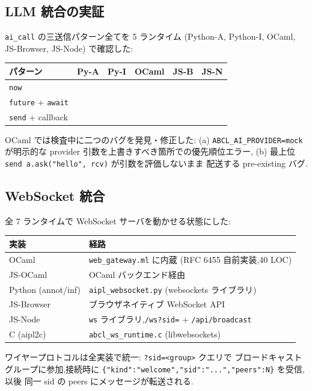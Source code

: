 \documentclass[11pt,a4paper]{article}
\newcommand{\Yes}{\textcolor{green!50!black}{\textbf{\checkmark}}}
\newcommand{\code}[1]{\texttt{\small #1}}
\begin{document}
\subsection{LLM 統合の実証}

\code{ai\_call} の三送信パターン全てを 5 ランタイム (Python-A, Python-I,
OCaml, JS-Browser, JS-Node) で確認した:

\begin{tabularx}{\linewidth}{X l l l l l}
  \toprule
  パターン & Py-A & Py-I & OCaml & JS-B & JS-N \\
  \midrule
  \code{now}                & \Yes & \Yes & \Yes & \Yes & \Yes \\
  \code{future} + \code{await} & \Yes & \Yes & \Yes & \Yes & \Yes \\
  \code{send} + callback     & \Yes & \Yes & \Yes & \Yes & \Yes \\
  \bottomrule
\end{tabularx}

OCaml では検査中に二つのバグを発見・修正した: (a) \code{ABCL\_AI\_PROVIDER=mock}
が明示的な provider 引数を上書きすべき箇所での優先順位エラー,
(b) 最上位 \code{send a.ask("hello",~rcv)} が引数を評価しないまま
配送する pre-existing バグ.

\subsection{WebSocket 統合}

全 7 ランタイムで WebSocket サーバを動かせる状態にした:

\begin{tabularx}{\linewidth}{X X}
  \toprule
  実装 & 経路 \\
  \midrule
  OCaml             & \code{web\_gateway.ml} に内蔵 (RFC 6455 自前実装,40 LOC) \\
  JS-OCaml          & OCaml バックエンド経由 \\
  Python (annot/inf) & \code{aipl\_websocket.py} (websockets ライブラリ) \\
  JS-Browser        & ブラウザネイティブ WebSocket API \\
  JS-Node           & \code{ws} ライブラリ,\code{/ws?sid=} + \code{/api/broadcast} \\
  C (aipl2c)        & \code{abcl\_ws\_runtime.c} (libwebsockets) \\
  \bottomrule
\end{tabularx}

ワイヤープロトコルは全実装で統一: \code{?sid=<group>} クエリで
ブロードキャストグループに参加,接続時に
\code{\{"kind":"welcome","sid":"...","peers":N\}} を受信,以後
同一 sid の peers にメッセージが転送される.
\end{document}
